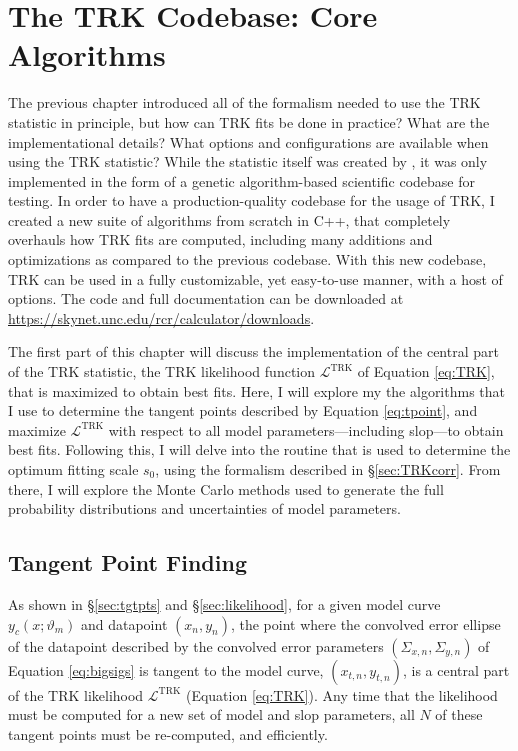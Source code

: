 \chapter{The TRK Codebase: Core Algorithms}
\label{cha:code1}
The previous chapter introduced all of the formalism needed to use the TRK statistic in principle, but how can TRK fits be done in practice? What are the implementational details? What options and configurations are available when using the TRK statistic? While the statistic itself was created by \textcite{trotter}, it was only implemented in the form of a genetic algorithm-based scientific codebase for testing. In order to have a production-quality codebase for the usage of TRK, I created a new suite of algorithms from scratch in C++, that completely overhauls how TRK fits are computed, including many additions and optimizations as compared to the previous codebase. With this new codebase, TRK can be used in a fully customizable, yet easy-to-use manner, with a host of options. The code and full documentation can be downloaded at \url{https://skynet.unc.edu/rcr/calculator/downloads}.

The first part of this chapter will discuss the implementation of the central part of the TRK statistic, the TRK likelihood function $\mathcal{L}^\text{TRK}$ of Equation \eqref{eq:TRK}, that is maximized to obtain best fits. Here, I will explore my the algorithms that I use to determine the tangent points described by Equation \eqref{eq:tpoint}, and maximize $\mathcal{L}^\text{TRK}$ with respect to all model parameters---including slop---to obtain best fits. Following this, I will delve into the routine that is used to determine the optimum fitting scale $s_0$, using the formalism described in \S\ref{sec:TRKcorr}. From there, I will explore the Monte Carlo methods used to generate the full probability distributions and uncertainties of model parameters.

\section{Tangent Point Finding}
\label{sec:tgtfinder}
As shown in \S\ref{sec:tgtpts} and \S\ref{sec:likelihood}, for a given model curve $y_c(x;\vartheta_m)$ and datapoint $(x_n,y_n)$, the point where the convolved error ellipse of the datapoint described by the convolved error parameters $(\Sigma_{x,n}, \Sigma_{y,n})$ of Equation \eqref{eq:bigsigs} is tangent to the model curve, $(x_{t,n},y_{t,n})$, is a central part of the TRK likelihood $\mathcal{L}^\text{TRK}$ (Equation \eqref{eq:TRK}). Any time that the likelihood must be computed for a new set of model and slop parameters, all $N$ of these tangent points must be re-computed, and efficiently.

